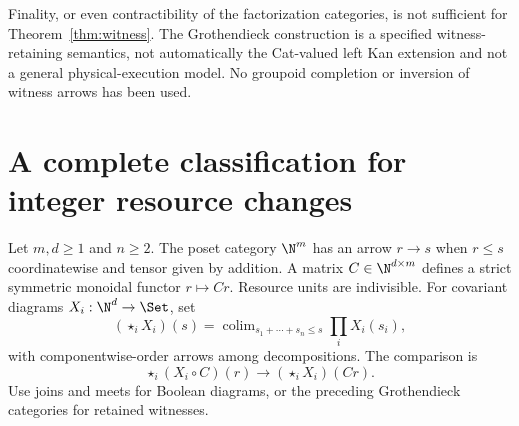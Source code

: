 Finality, or even contractibility of the factorization categories, is
not sufficient for Theorem~\ref{thm:witness}. The Grothendieck construction
is a specified witness-retaining semantics, not automatically the
Cat-valued left Kan extension and not a general physical-execution model.
No groupoid completion or inversion of witness arrows has been used.

\section{A complete classification for integer resource changes}\label{sec:resources}
Let $m,d\geq1$ and $n\geq2$. The poset category $\N^m$ has an arrow
$r\to s$ when $r\leq s$ coordinatewise and tensor given by addition.
A matrix $C\in\N^{d\times m}$ defines a strict symmetric monoidal
functor $r\mapsto Cr$. Resource units are indivisible. For covariant
diagrams $X_i:\N^d\to\Set$, set
\[
 (\mathop{\star}_iX_i)(s)
   =\mathop{\operatorname{colim}}_{s_1+\cdots+s_n\leq s}
      \prod_iX_i(s_i),
\]
with componentwise-order arrows among decompositions. The comparison is
\begin{equation}\label{eq:budget}
 \mathop{\star}_i(X_i\circ C)(r)
      \longrightarrow(\mathop{\star}_iX_i)(Cr).
\end{equation}
Use joins and meets for Boolean diagrams, or the preceding Grothendieck
categories for retained witnesses.


